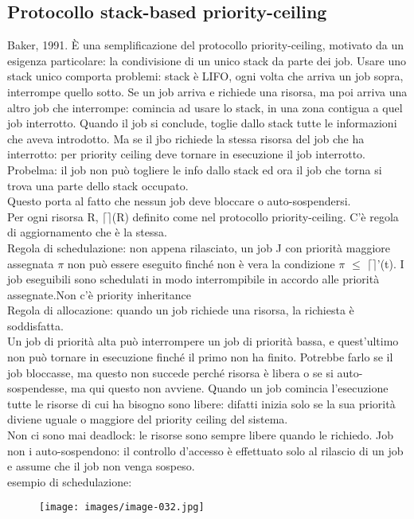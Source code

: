 \documentclass[12pt, oneside]{extbook}
\begin{document}
\subsection{Protocollo stack-based priority-ceiling}
Baker, 1991. È una semplificazione del protocollo priority-ceiling, motivato da un esigenza particolare: la condivisione di un unico stack da parte dei job. Usare uno stack unico comporta problemi: stack è LIFO, ogni volta che arriva un job sopra, interrompe quello sotto. Se un job arriva e richiede una risorsa, ma poi arriva una altro job che interrompe: comincia ad usare lo stack, in una zona contigua a quel job interrotto. Quando il job si conclude, toglie dallo stack tutte le informazioni che aveva introdotto. Ma se il jbo richiede la stessa risorsa del job che ha interrotto: per priority ceiling deve tornare in esecuzione il job interrotto. Probelma: il job non può togliere le info dallo stack ed ora il job che torna si trova una parte dello stack occupato.\\ Questo porta al fatto che nessun job deve bloccare o auto-sospendersi.\\ Per ogni risorsa R, $\lceil\rceil$(R) definito come nel protocollo priority-ceiling. C'è regola di aggiornamento che  è la stessa. \\ Regola di schedulazione: non appena rilasciato, un job J con priorità maggiore assegnata $\pi$ non può essere eseguito finché non è vera la condizione $\pi$ $\leq$ $\lceil\rceil$'(t). I job eseguibili sono schedulati in modo interrompibile in accordo alle priorità assegnate.Non c'è priority inheritance\\ Regola di allocazione: quando un job richiede una risorsa, la richiesta è soddisfatta.\\ Un job di priorità alta può interrompere un job di priorità bassa, e quest'ultimo non può tornare in esecuzione finché il primo non ha finito. Potrebbe farlo se il job bloccasse, ma questo non succede perché risorsa è libera o se si auto-sospendesse, ma qui questo non avviene. Quando un job comincia l'esecuzione tutte le risorse di cui ha bisogno sono libere: difatti inizia solo se la sua priorità diviene uguale o maggiore del priority ceiling del sistema.\\ Non ci sono mai deadlock: le risorse sono sempre libere quando le richiedo. Job non i auto-sospendono: il controllo d'accesso è effettuato solo al rilascio di un job e assume che il job non venga sospeso.\\ esempio di schedulazione:\\
\begin{figure}[!h]
\centering
\texttt{[image: images/image-032.jpg]}
\end{figure}
\end{document}
